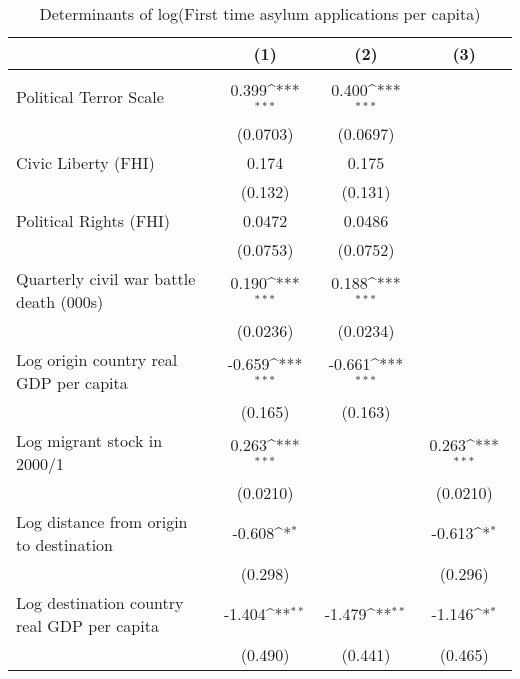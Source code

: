\begin{table}[htbp]\centering
\def\sym#1{\ifmmode^{#1}\else\(^{#1}\)\fi}
\caption{Determinants of log(First time asylum applications per capita)}
\begin{tabular}{l*{3}{c}}
\hline\hline
                    &\multicolumn{1}{c}{(1)}         &\multicolumn{1}{c}{(2)}         &\multicolumn{1}{c}{(3)}         \\
\hline
&\\
Political Terror Scale&       0.399\sym{***}&       0.400\sym{***}&                     \\
                    &    (0.0703)         &    (0.0697)         &                     \\
[0.7em]
Civic Liberty (FHI) &       0.174         &       0.175         &                     \\
                    &     (0.132)         &     (0.131)         &                     \\
[0.7em]
Political Rights (FHI)&      0.0472         &      0.0486         &                     \\
                    &    (0.0753)         &    (0.0752)         &                     \\
[0.7em]
Quarterly civil war battle death (000s)&       0.190\sym{***}&       0.188\sym{***}&                     \\
                    &    (0.0236)         &    (0.0234)         &                     \\
[0.7em]
Log origin country real GDP per capita&      -0.659\sym{***}&      -0.661\sym{***}&                     \\
                    &     (0.165)         &     (0.163)         &                     \\
[0.7em]
Log migrant stock in 2000/1&       0.263\sym{***}&                     &       0.263\sym{***}\\
                    &    (0.0210)         &                     &    (0.0210)         \\
[0.7em]
Log distance from origin to destination&      -0.608\sym{*}  &                     &      -0.613\sym{*}  \\
                    &     (0.298)         &                     &     (0.296)         \\
[0.7em]
Log destination country real GDP per capita&      -1.404\sym{**} &      -1.479\sym{**} &      -1.146\sym{*}  \\
                    &     (0.490)         &     (0.441)         &     (0.465)         \\

\end{tabular}
\end{table}
